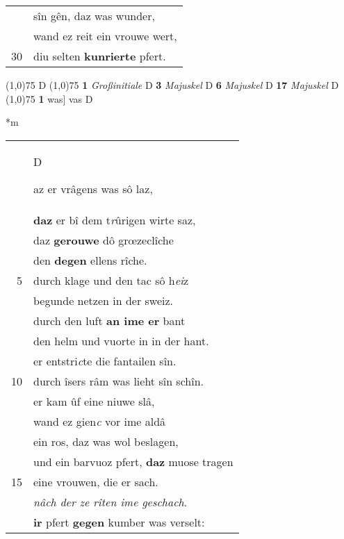 \documentclass[8pt,a4paper,notitlepage]{article}
\begin{document}
\begin{table}[ht]
\begin{minipage}[t]{0.5\linewidth}
\begin{tabular}{rl}
 & sîn gên, daz was wunder,\\ 
 & wand ez reit ein vrouwe wert,\\ 
30 & diu selten \textbf{kunrierte} pfert.\\ 
\end{tabular}
\scriptsize
\line(1,0){75} \newline
D \newline
\line(1,0){75} \newline
\textbf{1} \textit{Großinitiale} D  \textbf{3} \textit{Majuskel} D  \textbf{6} \textit{Majuskel} D  \textbf{17} \textit{Majuskel} D  \newline
\line(1,0){75} \newline
\textbf{1} was] vas D \newline
\end{minipage}
\hspace{0.5cm}
\begin{minipage}[t]{0.5\linewidth}
\small
\begin{center}*m
\end{center}
\begin{tabular}{rl}
 & \begin{large}D\end{large}az er vrâgens was sô laz,\\ 
 & \textbf{daz} er bî dem t\textit{r}ûrigen wirte saz,\\ 
 & daz \textbf{gerouwe} dô grœzeclîche\\ 
 & den \textbf{degen} ellens rîche.\\ 
5 & durch klage und den tac sô h\textit{ei}z\\ 
 & begunde netzen in der sweiz.\\ 
 & durch den luft \textbf{an ime er} bant\\ 
 & den helm und vuorte in in der hant.\\ 
 & er entstri\textit{c}te die fantailen sîn.\\ 
10 & durch îsers râm was lieht sîn schîn.\\ 
 & er kam ûf eine niuwe slâ,\\ 
 & wand ez gien\textit{c} vor ime aldâ\\ 
 & ein ros, daz was wol beslagen,\\ 
 & und ein barvuoz pfert, \textbf{daz} muose tragen\\ 
15 & eine vrouwen, die er sach.\\ 
 & \textit{nâch der ze rîten ime geschach}.\\ 
 & \textbf{ir} pfert \textbf{gegen} kumber was verselt:\\ 

\end{tabular}
\end{minipage}
\end{table}
\end{document}
